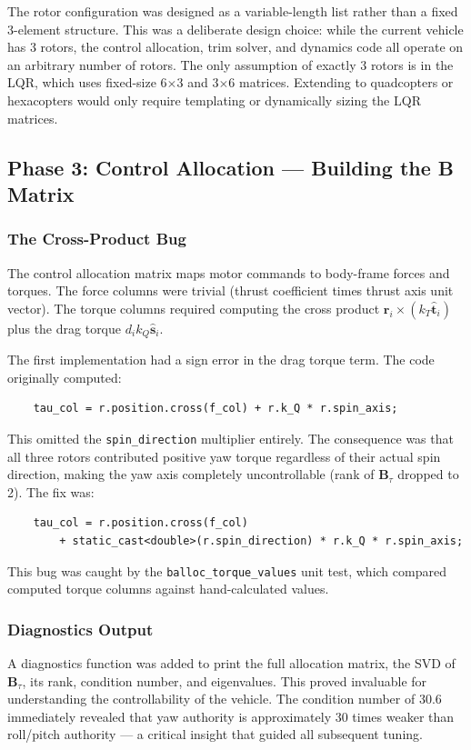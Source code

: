 \documentclass[12pt, a4paper]{article}
\newcommand{\bB}{\bm{B}}
\begin{document}
The rotor configuration was designed as a variable-length list rather than a fixed 3-element structure.  This was a deliberate design choice: while the current vehicle has 3 rotors, the control allocation, trim solver, and dynamics code all operate on an arbitrary number of rotors.  The only assumption of exactly 3 rotors is in the LQR, which uses fixed-size 6$\times$3 and 3$\times$6 matrices.  Extending to quadcopters or hexacopters would only require templating or dynamically sizing the LQR matrices.

\subsection{Phase 3: Control Allocation --- Building the B Matrix}

\subsubsection{The Cross-Product Bug}

The control allocation matrix maps motor commands to body-frame forces and torques.  The force columns were trivial (thrust coefficient times thrust axis unit vector).  The torque columns required computing the cross product $\bm{r}_i \times (k_T \hat{\bm{t}}_i)$ plus the drag torque $d_i k_Q \hat{\bm{s}}_i$.

The first implementation had a sign error in the drag torque term.  The code originally computed:
\begin{verbatim}
    tau_col = r.position.cross(f_col) + r.k_Q * r.spin_axis;
\end{verbatim}
This omitted the \texttt{spin\_direction} multiplier entirely.  The consequence was that all three rotors contributed positive yaw torque regardless of their actual spin direction, making the yaw axis completely uncontrollable (rank of $\bB_\tau$ dropped to 2).  The fix was:
\begin{verbatim}
    tau_col = r.position.cross(f_col)
        + static_cast<double>(r.spin_direction) * r.k_Q * r.spin_axis;
\end{verbatim}
This bug was caught by the \texttt{balloc\_torque\_values} unit test, which compared computed torque columns against hand-calculated values.

\subsubsection{Diagnostics Output}

A diagnostics function was added to print the full allocation matrix, the SVD of $\bB_\tau$, its rank, condition number, and eigenvalues.  This proved invaluable for understanding the controllability of the vehicle.  The condition number of 30.6 immediately revealed that yaw authority is approximately 30 times weaker than roll/pitch authority --- a critical insight that guided all subsequent tuning.
\end{document}
